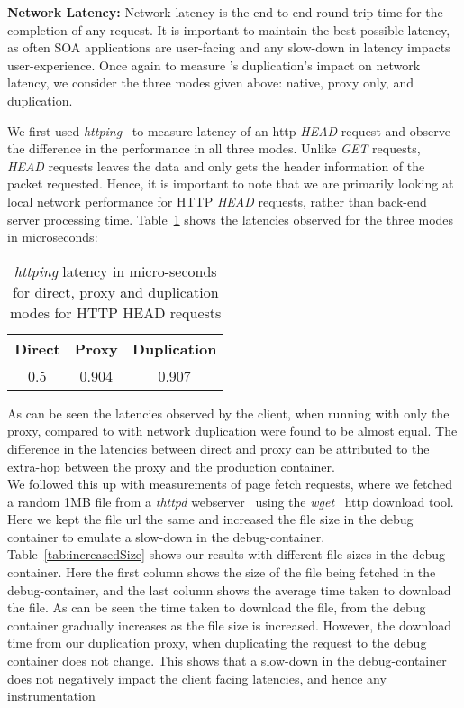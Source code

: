 \noindent \textbf{Network Latency:}
Network latency is the end-to-end round trip time for the completion of any request. 
It is important to maintain the best possible latency, as often SOA applications are user-facing and any slow-down in latency impacts user-experience. 
Once again to measure \parikshan's duplication's impact on network latency, we consider the three modes given above: native, proxy only, and duplication.

We first used \emph{httping}~\cite{httping} to measure latency of an http \emph{HEAD} request and observe the difference in the performance in all three modes. 
Unlike \emph{GET} requests, \emph{HEAD} requests leaves the data and only gets the header information of the packet requested. 
Hence, it is important to note that we are primarily looking at local network performance for HTTP \emph{HEAD} requests, rather than back-end server processing time.
Table~\ref{tab:httping} shows the latencies observed for the three modes in microseconds:\\

\begin{table}[ht]
	\centering
	\setlength{\tabcolsep}{4pt}
	\begin{center}
		\begin{tabular}{c c c}
			\toprule
			\textbf{Direct} & \textbf{Proxy} & \textbf{Duplication} \\
  			\midrule
  			0.5& 0.904& 0.907 \\
  			\bottomrule
		\end{tabular}
	\end{center}
\caption{ \emph{httping} latency in micro-seconds for direct, proxy and duplication modes for HTTP HEAD requests}
\label{tab:httping}
\end{table}
  
As can be seen the latencies observed by the client, when running with only the proxy, compared to with network duplication were found to be almost equal. 
The difference in the latencies between direct and proxy can be attributed to the extra-hop between the proxy and the production container. \\


We followed this up with measurements of page fetch requests, where we fetched a random 1MB file from a \emph{thttpd} webserver~\cite{thttpd} using the \emph{wget}~\cite{wget} http download tool.
Here we kept the file url the same and increased the file size in the debug container to emulate a slow-down in the debug-container.
Table~\ref{tab:increasedSize} shows our results with different file sizes in the debug container.
Here the first column shows the size of the file being fetched in the debug-container, and the last column shows the average time taken to download the file.
As can be seen the time taken to download the file, from the debug container gradually increases as the file size is increased.
However, the download time from our duplication proxy, when duplicating the request to the debug container does not change.
This shows that a slow-down in the debug-container does not negatively impact the client facing latencies, and hence any instrumentation  


